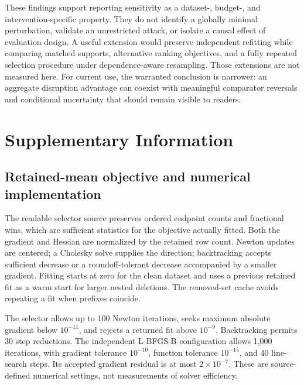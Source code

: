 \documentclass{article}
\begin{document}
These findings support reporting sensitivity as a dataset-, budget-, and intervention-specific property. They do not identify a globally minimal perturbation, validate an unrestricted attack, or isolate a causal effect of evaluation design. A useful extension would preserve independent refitting while comparing matched supports, alternative ranking objectives, and a fully repeated selection procedure under dependence-aware resampling. Those extensions are not measured here. For current use, the warranted conclusion is narrower: an aggregate disruption advantage can coexist with meaningful comparator reversals and conditional uncertainty that should remain visible to readers.

\clearpage



\clearpage
\appendix
\section{Supplementary Information}
\subsection{Retained-mean objective and numerical implementation}
The readable selector source preserves ordered endpoint counts and fractional wins, which are sufficient statistics for the objective actually fitted. Both the gradient and Hessian are normalized by the retained row count. Newton updates are centered; a Cholesky solve supplies the direction; backtracking accepts sufficient decrease or a roundoff-tolerant decrease accompanied by a smaller gradient. Fitting starts at zero for the clean dataset and uses a previous retained fit as a warm start for larger nested deletions. The removed-set cache avoids repeating a fit when prefixes coincide.

The selector allows up to 100 Newton iterations, seeks maximum absolute gradient below $10^{-11}$, and rejects a returned fit above $10^{-9}$. Backtracking permits 30 step reductions. The independent L-BFGS-B configuration allows 1,000 iterations, with gradient tolerance $10^{-10}$, function tolerance $10^{-15}$, and 40 line-search steps. Its accepted gradient residual is at most $2\times10^{-7}$. These are source-defined numerical settings, not measurements of solver efficiency.
\end{document}
